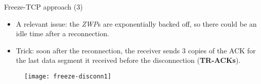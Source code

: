 \begin{frame}{Freeze-TCP approach (3)}
       \begin{itemize}
                \item A relevant issue: the \textit{ZWP}s are exponentially backed off,
			so there could be an idle time after a reconnection.
		\item Trick: soon after the reconnection, the receiver
		      sends 3 copies of the ACK for the last data segment
		      it received before the disconnection (\textbf{TR-ACKs}).
       \end{itemize}

       \begin{figure}
                \centering\texttt{[image: freeze-disconn1]}
       \end{figure}

\end{frame}
